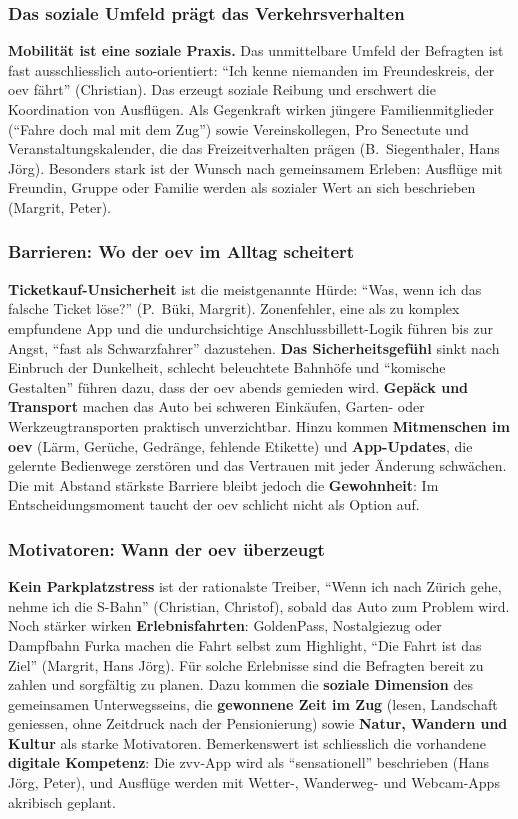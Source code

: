 \subsubsection{Das soziale Umfeld prägt das Verkehrsverhalten}

\textbf{Mobilität ist eine soziale Praxis.} Das unmittelbare Umfeld der Befragten ist fast ausschliesslich auto-orientiert: ``Ich kenne niemanden im Freundeskreis, der \gls{oev} fährt'' (Christian). Das erzeugt soziale Reibung und erschwert die Koordination von Ausflügen. Als Gegenkraft wirken jüngere Familienmitglieder (``Fahre doch mal mit dem Zug'') sowie Vereinskollegen, Pro Senectute und Veranstaltungskalender, die das Freizeitverhalten prägen (B.~Siegenthaler, Hans Jörg). Besonders stark ist der Wunsch nach gemeinsamem Erleben: Ausflüge mit Freundin, Gruppe oder Familie werden als sozialer Wert an sich beschrieben (Margrit, Peter).

\subsubsection{Barrieren: Wo der \gls{oev} im Alltag scheitert}

\textbf{Ticketkauf-Unsicherheit} ist die meistgenannte Hürde: ``Was, wenn ich das falsche Ticket löse?'' (P.~Büki, Margrit). Zonenfehler, eine als zu komplex empfundene App und die undurchsichtige Anschlussbillett-Logik führen bis zur Angst, ``fast als Schwarzfahrer'' dazustehen. \textbf{Das Sicherheitsgefühl} sinkt nach Einbruch der Dunkelheit, schlecht beleuchtete Bahnhöfe und ``komische Gestalten'' führen dazu, dass der \gls{oev} abends gemieden wird. \textbf{Gepäck und Transport} machen das Auto bei schweren Einkäufen, Garten- oder Werkzeugtransporten praktisch unverzichtbar. Hinzu kommen \textbf{Mitmenschen im \gls{oev}} (Lärm, Gerüche, Gedränge, fehlende Etikette) und \textbf{App-Updates}, die gelernte Bedienwege zerstören und das Vertrauen mit jeder Änderung schwächen. Die mit Abstand stärkste Barriere bleibt jedoch die \textbf{Gewohnheit}: Im Entscheidungsmoment taucht der \gls{oev} schlicht nicht als Option auf.

\subsubsection{Motivatoren: Wann der \gls{oev} überzeugt}

\textbf{Kein Parkplatzstress} ist der rationalste Treiber, ``Wenn ich nach Zürich gehe, nehme ich die S-Bahn'' (Christian, Christof), sobald das Auto zum Problem wird. Noch stärker wirken \textbf{Erlebnisfahrten}: GoldenPass, Nostalgiezug oder Dampfbahn Furka machen die Fahrt selbst zum Highlight, ``Die Fahrt ist das Ziel'' (Margrit, Hans Jörg). Für solche Erlebnisse sind die Befragten bereit zu zahlen und sorgfältig zu planen. Dazu kommen die \textbf{soziale Dimension} des gemeinsamen Unterwegsseins, die \textbf{gewonnene Zeit im Zug} (lesen, Landschaft geniessen, ohne Zeitdruck nach der Pensionierung) sowie \textbf{Natur, Wandern und Kultur} als starke Motivatoren. Bemerkenswert ist schliesslich die vorhandene \textbf{digitale Kompetenz}: Die \gls{zvv}-App wird als ``sensationell'' beschrieben (Hans Jörg, Peter), und Ausflüge werden mit Wetter-, Wanderweg- und Webcam-Apps akribisch geplant.

